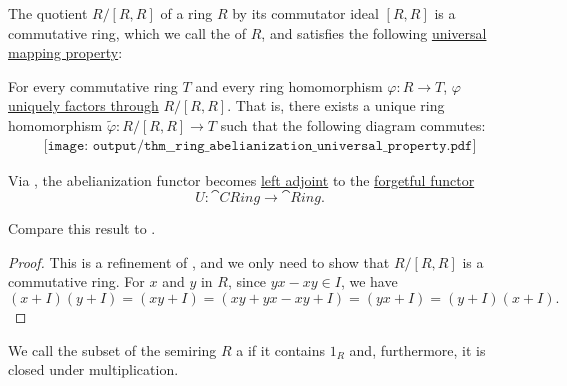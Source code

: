 \begin{theorem}\label{thm:ring_abelianization_universal_property}
  The quotient \( R / [R, R] \) of a ring \( R \) by its commutator ideal \( [R, R] \) is a commutative ring, which we call the  of \( R \), and satisfies the following \hyperref[rem:universal_mapping_property]{universal mapping property}:
  \begin{displayquote}
    For every commutative ring \( T \) and every ring homomorphism \( \varphi: R \to T \), \( \varphi \) \hyperref[def:factors_through]{uniquely factors through} \( R / [R, R] \). That is, there exists a unique ring homomorphism \( \widetilde{\varphi}: R / [R, R] \to T \) such that the following diagram commutes:
    \begin{equation}\label{eq:thm:ring_abelianization_universal_property/diagram}
      \begin{aligned}
        \texttt{[image: output/thm\_\_ring\_abelianization\_universal\_property.pdf]}
      \end{aligned}
    \end{equation}
  \end{displayquote}

  Via , the abelianization functor becomes \hyperref[def:category_adjunction]{left adjoint} to the \hyperref[def:concrete_category]{forgetful functor}
  \begin{equation*}
    U: \cat{CRing} \to \cat{Ring}.
  \end{equation*}

  Compare this result to .
\end{theorem}
\begin{proof}
  This is a refinement of , and we only need to show that \( R / [R, R] \) is a commutative ring. For \( x \) and \( y \) in \( R \), since \( yx - xy \in I \), we have
  \begin{equation*}
    (x + I) (y + I)
    =
    (xy + I)
    =
    (xy + yx - xy + I)
    =
    (yx + I)
    =
    (y + I) (x + I).
  \end{equation*}
\end{proof}

\begin{definition}\label{def:multiplicative_set_in_semiring}
  We call the subset of the semiring \( R \) a  if it contains \( 1_R \) and, furthermore, it is closed under multiplication.
\end{definition}

